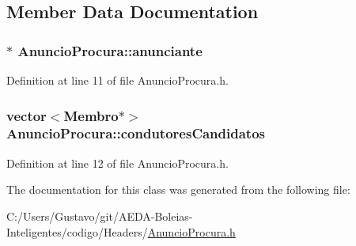 \subsection{Member Data Documentation}
\hypertarget{class_anuncio_procura_aa6a47ee352a486c19e0a366cd754f097}{
\subsubsection[{anunciante}]{$\ast$ Anuncio\+Procura\+::anunciante\hspace{0.3cm}{\ttfamily [private]}}}\label{class_anuncio_procura_aa6a47ee352a486c19e0a366cd754f097}


Definition at line 11 of file Anuncio\+Procura.\+h.

\hypertarget{class_anuncio_procura_afd57f0f4bf61422798fdb964c3fe860b}{
\subsubsection[{condutores\+Candidatos}]{\setlength{\rightskip}{0pt plus 5cm}vector$<${\bf Membro}$\ast$$>$ Anuncio\+Procura\+::condutores\+Candidatos\hspace{0.3cm}{\ttfamily [private]}}}\label{class_anuncio_procura_afd57f0f4bf61422798fdb964c3fe860b}


Definition at line 12 of file Anuncio\+Procura.\+h.



The documentation for this class was generated from the following file\+:\begin{DoxyCompactItemize}
\item 
C\+:/\+Users/\+Gustavo/git/\+A\+E\+D\+A-\/\+Boleias-\/\+Inteligentes/codigo/\+Headers/\hyperlink{_anuncio_procura_8h}{Anuncio\+Procura.\+h}\end{DoxyCompactItemize}
